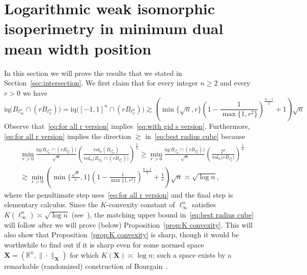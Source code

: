 \documentclass[11pt,reqno]{amsart}
\renewcommand{\ge}{\geqslant}
\newcommand{\X}{\mathbf X}
\newcommand{\R}{\mathbb R}
\theoremstyle{remark}
\newcommand{\iq}{\mathrm{iq}}
\newcommand{\vol}{\mathrm{vol}}
\renewcommand{\1}{\mathbf 1}
\begin{document}
\section{Logarithmic weak isomorphic isoperimetry in minimum dual  mean width position}\label{sec:log weak} In this section we will prove the results that we stated in Section~\ref{sec:intersection}. We first claim that for every integer $n\ge 2$ and every $r>0$ we have
\begin{equation}\label{eq:for all r version}
\iq \big(B_{\ell_\infty^n}\cap (rB_{\ell_2^n})\big)=\iq \big([-1,1]^n\cap (rB_{\ell_2^n})\big)\gtrsim  \left(\min\big\{\sqrt{n},r\big\}\left(1-\frac{1}{\max\big\{1,r^2\big\}}\right)^{\frac{n-1}{2}}+1\right)\sqrt{n}
\end{equation}
Observe that~\eqref{eq:for all r version} implies~\eqref{eq:with gid s version}. Furthermore, \eqref{eq:for all r version} implies the direction $\gtrsim$ in~\eqref{eq:best radius cube} because
\begin{multline*}
\min_{r>0}\frac{\iq\big(B_{\ell_\infty^n}\cap (rB_{\ell_2^n})\big)}{\sqrt{n}}\left(\frac{\vol_n(B_{\ell_\infty^n})}{\vol_n\big(B_{\ell_\infty^n}\cap (rB_{\ell_2^n})\big)}\right)^{\frac{1}{n}}\ge \min_{r>0} \frac{\iq\big(B_{\ell_\infty^n}\cap (rB_{\ell_2^n})\big)}{\sqrt{n}}\left(\frac{2^n}{\vol_n\big( rB_{\ell_2^n}\big)}\right)^{\frac{1}{n}}\\\gtrsim \min_{r>0}\left(\min\Big\{\frac{\sqrt{n}}{r},1\Big\}\left(1-\frac{1}{\max\big\{1,r^2\big\}}\right)^{\frac{n-1}{2}}+\frac{1}{r}\right)\sqrt{n}\asymp \sqrt{\log n},
\end{multline*}
where the penultimate step uses~\eqref{eq:for all r version} and the final step is elementary calculus. Since the $K$-convexity constant of $\ell_\infty^n$ satisfies $K(\ell_\infty^n)\asymp \sqrt{\log n}$ (see~\cite[Chapter~2]{Pis89}), the matching upper bound in~\eqref{eq:best radius cube}  will follow after we will prove (below) Proposition~\ref{prop:K convexity}. This will also show that  Proposition~\ref{prop:K convexity} is sharp, though it would be worthwhile to find out  if it is sharp even for some normed space $\X=(\R^n,\|\cdot\|_\X)$ for which $K(\X)\asymp \log n$; such a space exists  by a remarkable (randomized) construction of Bourgain~\cite{Bou84}.
\end{document}
